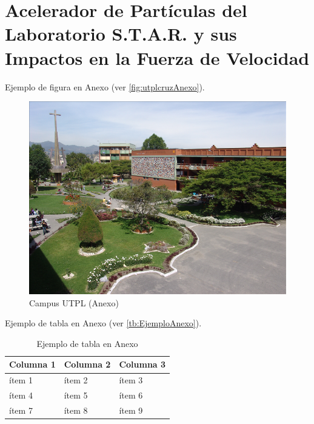 %
%
%
\chapter{Acelerador de Partículas del Laboratorio S.T.A.R. y sus Impactos en la Fuerza de Velocidad}

\Blindtext

Ejemplo de figura en Anexo (ver \autoref{fig:utplcruzAnexo}). 

\begin{figure}[h!]
	\centering
	\captionsetup{width=0.7\textwidth}
	\caption{Campus UTPL (Anexo) \vspace{-5pt}}
	\label{fig:utplcruzAnexo}
	\includegraphics[width=0.7\linewidth]{FIGURES/UTPL_cruz}
\end{figure}

Ejemplo de tabla en Anexo (ver \autoref{tb:EjemploAnexo}).

\begin{table}[h!]
	\centering
	\captionsetup{width=0.44\textwidth}
	\caption{Ejemplo de tabla en Anexo}
	\label{tb:EjemploAnexo}
	\begin{tabular}{|l|l|l|}
		\hline
		\textbf{Columna 1} & \textbf{Columna 2} & \textbf{Columna 3} \\ \hline
		ítem 1             & ítem 2             & ítem 3             \\ \hline
		ítem 4             & ítem 5             & ítem 6             \\ \hline
		ítem 7             & ítem 8             & ítem 9             \\ \hline
	\end{tabular}
	\NotaCaptionUTPL{}		
\end{table}


